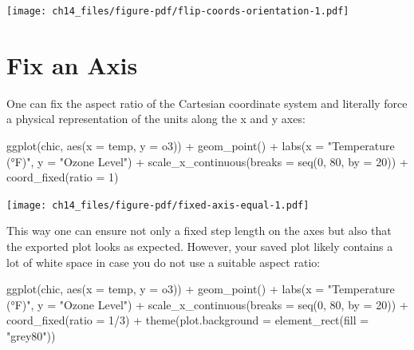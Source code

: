 \documentclass[
  letterpaper,
  DIV=11,
  numbers=noendperiod]{scrreprt}
\newenvironment{Shaded}{\begin{snugshade}}{\end{snugshade}}
\newcommand{\AttributeTok}[1]{\textcolor[rgb]{0.40,0.45,0.13}{#1}}
\newcommand{\DecValTok}[1]{\textcolor[rgb]{0.68,0.00,0.00}{#1}}
\newcommand{\FunctionTok}[1]{\textcolor[rgb]{0.28,0.35,0.67}{#1}}
\newcommand{\NormalTok}[1]{\textcolor[rgb]{0.00,0.23,0.31}{#1}}
\newcommand{\SpecialCharTok}[1]{\textcolor[rgb]{0.37,0.37,0.37}{#1}}
\newcommand{\StringTok}[1]{\textcolor[rgb]{0.13,0.47,0.30}{#1}}
\begin{document}
\texttt{[image: ch14\_files/figure-pdf/flip-coords-orientation-1.pdf]}

\section{Fix an Axis}\label{fix-an-axis}

One can fix the aspect ratio of the Cartesian coordinate system and
literally force a physical representation of the units along the x and y
axes:

\begin{Shaded}
\begin{Highlighting}[]
\FunctionTok{ggplot}\NormalTok{(chic, }\FunctionTok{aes}\NormalTok{(}\AttributeTok{x =}\NormalTok{ temp, }\AttributeTok{y =}\NormalTok{ o3)) }\SpecialCharTok{+}
  \FunctionTok{geom\_point}\NormalTok{() }\SpecialCharTok{+}
  \FunctionTok{labs}\NormalTok{(}\AttributeTok{x =} \StringTok{"Temperature (°F)"}\NormalTok{, }\AttributeTok{y =} \StringTok{"Ozone Level"}\NormalTok{) }\SpecialCharTok{+}
  \FunctionTok{scale\_x\_continuous}\NormalTok{(}\AttributeTok{breaks =} \FunctionTok{seq}\NormalTok{(}\DecValTok{0}\NormalTok{, }\DecValTok{80}\NormalTok{, }\AttributeTok{by =} \DecValTok{20}\NormalTok{)) }\SpecialCharTok{+}
  \FunctionTok{coord\_fixed}\NormalTok{(}\AttributeTok{ratio =} \DecValTok{1}\NormalTok{)}
\end{Highlighting}
\end{Shaded}

\texttt{[image: ch14\_files/figure-pdf/fixed-axis-equal-1.pdf]}

This way one can ensure not only a fixed step length on the axes but
also that the exported plot looks as expected. However, your saved plot
likely contains a lot of white space in case you do not use a suitable
aspect ratio:

\begin{Shaded}
\begin{Highlighting}[]
\FunctionTok{ggplot}\NormalTok{(chic, }\FunctionTok{aes}\NormalTok{(}\AttributeTok{x =}\NormalTok{ temp, }\AttributeTok{y =}\NormalTok{ o3)) }\SpecialCharTok{+}
  \FunctionTok{geom\_point}\NormalTok{() }\SpecialCharTok{+}
  \FunctionTok{labs}\NormalTok{(}\AttributeTok{x =} \StringTok{"Temperature (°F)"}\NormalTok{, }\AttributeTok{y =} \StringTok{"Ozone Level"}\NormalTok{) }\SpecialCharTok{+}
  \FunctionTok{scale\_x\_continuous}\NormalTok{(}\AttributeTok{breaks =} \FunctionTok{seq}\NormalTok{(}\DecValTok{0}\NormalTok{, }\DecValTok{80}\NormalTok{, }\AttributeTok{by =} \DecValTok{20}\NormalTok{)) }\SpecialCharTok{+}
  \FunctionTok{coord\_fixed}\NormalTok{(}\AttributeTok{ratio =} \DecValTok{1}\SpecialCharTok{/}\DecValTok{3}\NormalTok{) }\SpecialCharTok{+}
  \FunctionTok{theme}\NormalTok{(}\AttributeTok{plot.background =} \FunctionTok{element\_rect}\NormalTok{(}\AttributeTok{fill =} \StringTok{"grey80"}\NormalTok{))}
\end{Highlighting}
\end{Shaded}
\end{document}
